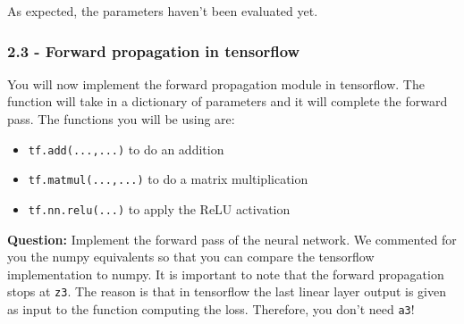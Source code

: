 \documentclass[11pt]{article}
\providecommand{\tightlist}{%
      \setlength{\itemsep}{0pt}\setlength{\parskip}{0pt}}
\begin{document}
    As expected, the parameters haven't been evaluated yet.

    \subsubsection{2.3 - Forward propagation in
tensorflow}\label{forward-propagation-in-tensorflow}

You will now implement the forward propagation module in tensorflow. The
function will take in a dictionary of parameters and it will complete
the forward pass. The functions you will be using are:

\begin{itemize}
\tightlist
\item
  \texttt{tf.add(...,...)} to do an addition
\item
  \texttt{tf.matmul(...,...)} to do a matrix multiplication
\item
  \texttt{tf.nn.relu(...)} to apply the ReLU activation
\end{itemize}

\textbf{Question:} Implement the forward pass of the neural network. We
commented for you the numpy equivalents so that you can compare the
tensorflow implementation to numpy. It is important to note that the
forward propagation stops at \texttt{z3}. The reason is that in
tensorflow the last linear layer output is given as input to the
function computing the loss. Therefore, you don't need \texttt{a3}!
\end{document}
